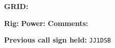 \documentclass{article}
\begin{document}
\vfill

\footnotesize \textbf{GRID:}
\vfill

\footnotesize \textbf{Rig:} \makebox[0.3\textwidth]{} \textbf{Power:} \makebox[0.1\textwidth]{} \textbf{Comments:}

\vfill

\footnotesize \textbf{Previous call sign held:} \texttt{JJ1DSB}

\vfill


\vfill

\tiny
\end{document}
